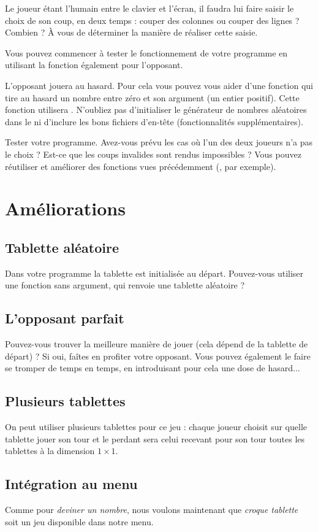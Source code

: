 Le joueur étant l'humain entre le clavier et l'écran, il faudra lui
faire saisir le choix de son coup, en deux temps : couper des colonnes
ou couper des lignes ? Combien ? À vous de déterminer la manière de
réaliser cette saisie.

Vous pouvez commencer à tester le fonctionnement de votre programme en
utilisant la fonction  également pour l'opposant.

L'opposant jouera au hasard. Pour cela vous pouvez vous aider d'une
fonction  qui tire au hasard un nombre entre
zéro et son argument (un entier positif). Cette fonction utilisera
. N'oubliez pas d'initialiser
le générateur de nombres aléatoires dans le  ni d'inclure
les bons fichiers d'en-tête (fonctionnalités supplémentaires).

Tester votre programme. Avez-vous prévu les cas où l'un des deux
joueurs n'a pas le choix ? Est-ce que les coups invalides sont rendus
impossibles ? Vous pouvez réutiliser et améliorer des fonctions vues
précédemment (, par exemple).

\section{Améliorations}

\subsection{Tablette aléatoire}
Dans votre programme la tablette est initialisée au
départ. Pouvez-vous utiliser une fonction sans argument,
 qui renvoie une tablette aléatoire ?

\subsection{L'opposant parfait}
Pouvez-vous trouver la meilleure manière de jouer (cela dépend de la
tablette de départ) ? Si oui, faîtes en profiter votre opposant. Vous
pouvez également le faire se tromper de temps en temps, en introduisant
pour cela une dose de hasard...

\subsection{Plusieurs tablettes}
On peut utiliser plusieurs tablettes pour ce jeu : chaque joueur
choisit sur quelle tablette jouer son tour et le perdant sera celui
recevant pour son tour toutes les tablettes à la dimension $1\times
1$.

\subsection{Intégration au menu}
Comme pour \emph{deviner un nombre}, nous voulons maintenant que \emph{croque
tablette} soit un jeu disponible dans notre menu.

\begin{correction}
{
\footnotesize
{}
}
\end{correction}



